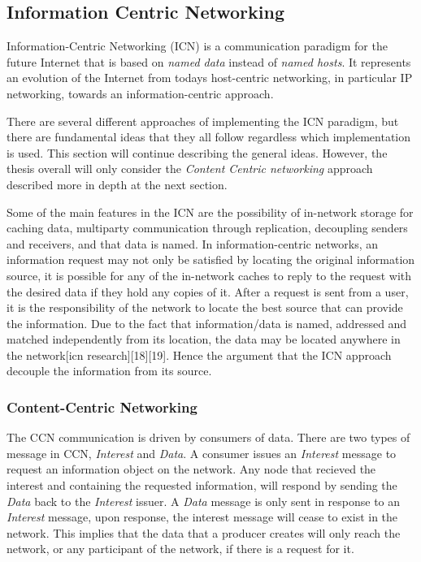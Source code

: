 
\subsection{Information Centric Networking}
Information-Centric Networking (ICN) is a communication paradigm for the future Internet that is based on \textit{named data} instead of \textit{named hosts}. It represents an evolution of the Internet from todays host-centric networking, in particular IP networking, towards an information-centric approach.

There are several different approaches of implementing the ICN paradigm, but there are fundamental ideas that they all follow regardless which implementation is used. This section will continue describing the general ideas. However, the thesis overall will only consider the \textit{Content Centric networking} approach described more in depth at the next section.

Some of the main features in the ICN are the possibility of in-network storage for caching data, multiparty communication through replication, decoupling senders and receivers, and that data is named\cite{Ahlgren2012}. In information-centric networks, an information request may not only be satisfied by locating the original information source, it is possible for any of the in-network caches to reply to the request with the desired data if they hold any copies of it. After a request is sent from a user, it is the responsibility of the network to locate the best source that can provide the information. Due to the fact that information/data is named, addressed and matched independently from its location, the data may be located anywhere in the network[icn research][18][19]. Hence the argument that the ICN approach decouple the information from its source.




\subsubsection{Content-Centric Networking}



The CCN communication \cite{Jacobson2009} is driven by consumers of data. There are two types of message in CCN, \textit{Interest} and \textit{Data}. A consumer issues an \textit{Interest} message to request an information object on the network. Any node that recieved the interest and containing the requested information, will respond by sending the \textit{Data} back to the \textit{Interest} issuer. A \textit{Data} message is only sent in response to an \textit{Interest} message, upon response, the interest message will cease to exist in the network. This implies that the data that a producer creates will only reach the network, or any participant of the network, if there is a request for it.

